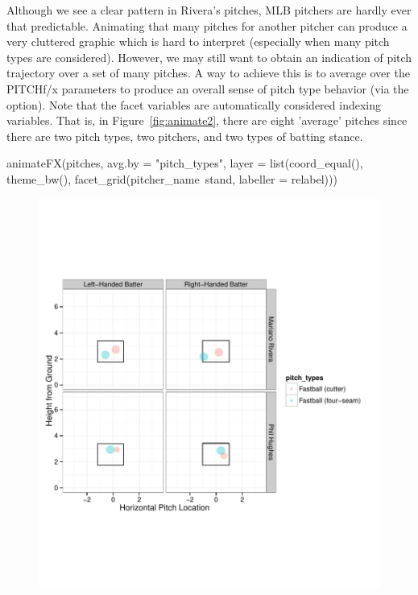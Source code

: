 \begin{article}
Although we see a clear pattern in Rivera's pitches, MLB pitchers
are hardly ever that predictable. Animating that many pitches for
another pitcher can produce a very cluttered graphic which is hard
to interpret (especially when many pitch types are considered). However,
we may still want to obtain an indication of pitch trajectory over
a set of many pitches. A way to achieve this is to average over the
PITCHf/x parameters to produce an overall sense of pitch type behavior
(via the  option). Note that the facet variables are
automatically considered indexing variables. That is, in Figure~\ref{fig:animate2},
there are eight 'average' pitches since there are two pitch types,
two pitchers, and two types of batting stance.
%
\begin{Schunk}
\begin{Sinput}
animateFX(pitches, avg.by = "pitch_types", layer = list(coord_equal(), theme_bw(),
  facet_grid(pitcher_name~stand, labeller = relabel)))
\end{Sinput}
\end{Schunk}
%
\begin{figure}[h]
\centerline{\includegraphics[scale = 1]{ani2-frame.pdf}}


\end{figure}
\end{article}
